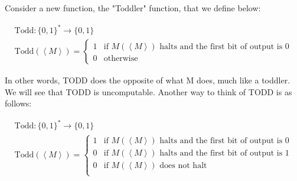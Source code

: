 Consider a new function, the "Toddler" function, that we define below:

\begin{gather*}
    \text{Todd}: \{0, 1\}^* \rightarrow \{0, 1\} \\
    \text{Todd}(\left<M\right>) = \begin{cases}
        1 & \text{if $M(\left<M\right>)$ halts and the first bit of output is 0} \\
        0 & \text{otherwise}
    \end{cases}
\end{gather*}

In other words, TODD does the opposite of what M does, much like a toddler. We will see that TODD is uncomputable. Another way to think of TODD is as follows:

\begin{gather*}
    \text{Todd}: \{0, 1\}^* \rightarrow \{0, 1\} \\
    \text{Todd}(\left<M\right>) = \begin{cases}
        1 & \text{if $M(\left<M\right>)$ halts and the first bit of output is 0} \\
        0 & \text{if $M(\left<M\right>)$ halts and the first bit of output is 1} \\
        0 & \text{if $M(\left<M\right>)$ does not halt} \\
    \end{cases}
\end{gather*}

